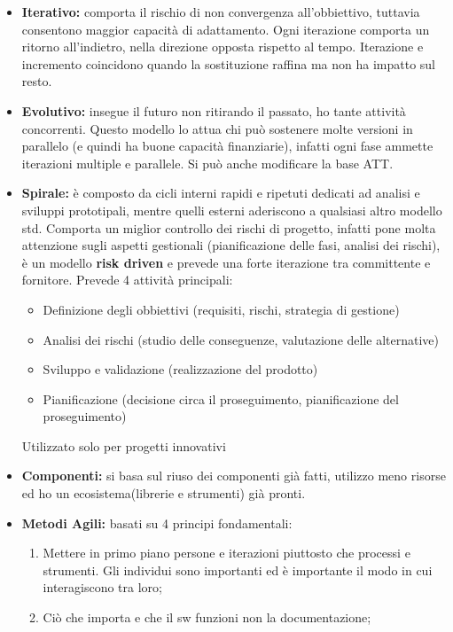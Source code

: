 \begin{itemize}
	\item \textbf{Iterativo:} comporta il rischio di non convergenza all'obbiettivo, tuttavia consentono maggior capacità di adattamento. Ogni iterazione comporta un ritorno all'indietro, nella direzione opposta rispetto al tempo. Iterazione e incremento coincidono quando la sostituzione raffina ma non ha impatto sul resto.
	\item \textbf{Evolutivo:} insegue il futuro non ritirando il passato, ho tante attività concorrenti. Questo modello lo attua chi può sostenere molte versioni in parallelo (e quindi ha buone capacità finanziarie), infatti ogni fase ammette iterazioni multiple e parallele. Si può anche modificare la base ATT.
	\item\textbf{Spirale:} è composto da cicli interni rapidi e ripetuti dedicati ad analisi e sviluppi prototipali, mentre quelli esterni aderiscono a qualsiasi altro modello std. Comporta un miglior controllo dei rischi di progetto, infatti pone molta attenzione sugli aspetti gestionali (pianificazione delle fasi, analisi dei rischi), è un modello \textbf{risk driven} e prevede una forte iterazione tra committente e fornitore. Prevede 4 attività principali:
		\begin{itemize}
			\item Definizione degli obbiettivi (requisiti, rischi, strategia di gestione)
			\item Analisi dei rischi (studio delle conseguenze, valutazione delle alternative)
			\item Sviluppo e validazione (realizzazione del prodotto)
			\item Pianificazione (decisione circa il proseguimento, pianificazione del proseguimento)
		\end{itemize}
	Utilizzato solo per progetti innovativi
	\item \textbf{Componenti:} si basa sul riuso dei componenti già fatti, utilizzo meno risorse ed ho un ecosistema(librerie e strumenti) già pronti.
	\item \textbf{Metodi Agili:} basati su 4 principi fondamentali:
	\begin{enumerate}

		\item Mettere in primo piano persone e iterazioni piuttosto che processi e strumenti. Gli individui sono importanti ed è importante il modo in cui interagiscono tra loro;
	
		\item Ciò  che importa e che il sw funzioni non la documentazione;
	

\end{enumerate}
\end{itemize}
